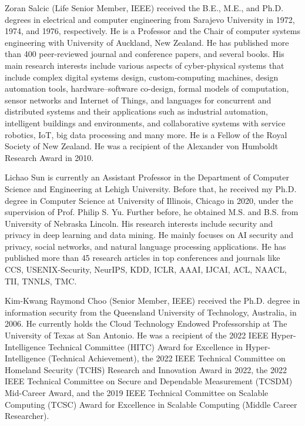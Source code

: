 \documentclass[10pt,journal,compsoc]{IEEEtran}
\begin{document}
\begin{IEEEbiography}{Zoran Salcic}
(Life Senior Member, IEEE) received the B.E., M.E., and Ph.D. degrees in electrical and computer engineering from Sarajevo University in 1972, 1974, and 1976, respectively. He is a Professor and the Chair of computer systems engineering with University of Auckland, New Zealand. He has published more than 400 peer-reviewed journal and conference papers, and several books. His main research interests include various aspects of cyber-physical systems that include complex digital systems design, custom-computing machines, design automation tools, hardware–software co-design, formal models of computation, sensor networks and Internet of Things, and languages for concurrent and distributed systems and their applications such as industrial automation, intelligent buildings and environments, and collaborative systems with service robotics, IoT, big data processing and many more. He is a Fellow of the Royal Society of New Zealand. He was a recipient of the Alexander von Humboldt Research Award in 2010.
\end{IEEEbiography}

\begin{IEEEbiography}{Lichao Sun}
is currently an Assistant Professor in the Department of Computer Science and Engineering at Lehigh University. Before that, he received my Ph.D. degree in Computer Science at University of Illinois, Chicago in 2020, under the supervision of Prof. Philip S. Yu. Further before, he obtained M.S. and B.S. from University of Nebraska Lincoln. His research interests include security and privacy in deep learning and data mining. He mainly focuses on AI security and privacy, social networks, and natural language processing applications. He has published more than 45 research articles in top conferences and journals like CCS, USENIX-Security, NeurIPS, KDD, ICLR, AAAI, IJCAI, ACL, NAACL, TII, TNNLS, TMC.
\end{IEEEbiography}



\begin{IEEEbiography}{Kim-Kwang Raymond Choo} (Senior Member, IEEE) received the Ph.D. degree in information security from the Queensland University of Technology, Australia, in 2006. He currently holds the Cloud Technology Endowed Professorship at The University of Texas at San Antonio. He was a recipient of the 2022 IEEE Hyper-Intelligence Technical Committee (HITC) Award for Excellence in Hyper-Intelligence (Technical Achievement), the 2022 IEEE Technical Committee on Homeland Security (TCHS) Research and Innovation Award in 2022, the 2022 IEEE Technical Committee on Secure and Dependable Measurement (TCSDM) Mid-Career Award, and the 2019 IEEE Technical Committee on Scalable Computing (TCSC) Award for Excellence in Scalable Computing (Middle Career Researcher).
\end{IEEEbiography}
\end{document}
